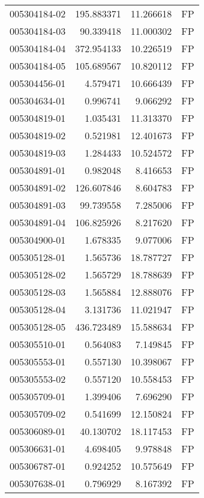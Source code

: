 \begin{tabular}{lrrl}
005304184-02 &  195.883371 &      11.266618 &   FP \\
005304184-03 &   90.339418 &      11.000302 &   FP \\
005304184-04 &  372.954133 &      10.226519 &   FP \\
005304184-05 &  105.689567 &      10.820112 &   FP \\
005304456-01 &    4.579471 &      10.666439 &   FP \\
005304634-01 &    0.996741 &       9.066292 &   FP \\
005304819-01 &    1.035431 &      11.313370 &   FP \\
005304819-02 &    0.521981 &      12.401673 &   FP \\
005304819-03 &    1.284433 &      10.524572 &   FP \\
005304891-01 &    0.982048 &       8.416653 &   FP \\
005304891-02 &  126.607846 &       8.604783 &   FP \\
005304891-03 &   99.739558 &       7.285006 &   FP \\
005304891-04 &  106.825926 &       8.217620 &   FP \\
005304900-01 &    1.678335 &       9.077006 &   FP \\
005305128-01 &    1.565736 &      18.787727 &   FP \\
005305128-02 &    1.565729 &      18.788639 &   FP \\
005305128-03 &    1.565884 &      12.888076 &   FP \\
005305128-04 &    3.131736 &      11.021947 &   FP \\
005305128-05 &  436.723489 &      15.588634 &   FP \\
005305510-01 &    0.564083 &       7.149845 &   FP \\
005305553-01 &    0.557130 &      10.398067 &   FP \\
005305553-02 &    0.557120 &      10.558453 &   FP \\
005305709-01 &    1.399406 &       7.696290 &   FP \\
005305709-02 &    0.541699 &      12.150824 &   FP \\
005306089-01 &   40.130702 &      18.117453 &   FP \\
005306631-01 &    4.698405 &       9.978848 &   FP \\
005306787-01 &    0.924252 &      10.575649 &   FP \\
005307638-01 &    0.796929 &       8.167392 &   FP \\

\end{tabular}
